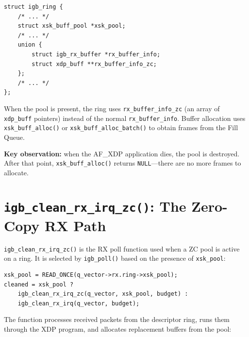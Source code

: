 \documentclass[11pt,a4paper,openany]{book}
\newcommand{\func}[1]{\texttt{#1()}}
\newcommand{\sym}[1]{\texttt{#1}}
\begin{document}
\begin{lstlisting}[caption={XSK pool reference in \texttt{igb\_ring} (igb.h)}]
struct igb_ring {
    /* ... */
    struct xsk_buff_pool *xsk_pool;
    /* ... */
    union {
        struct igb_rx_buffer *rx_buffer_info;
        struct xdp_buff **rx_buffer_info_zc;
    };
    /* ... */
};
\end{lstlisting}

When the pool is present, the ring uses \sym{rx\_buffer\_info\_zc} (an
array of \sym{xdp\_buff} pointers) instead of the normal
\sym{rx\_buffer\_info}.  Buffer allocation uses \func{xsk\_buff\_alloc}
or \func{xsk\_buff\_alloc\_batch} to obtain frames from the Fill Queue.

\textbf{Key observation:} when the AF\_XDP application dies, the pool
is destroyed.  After that point, \func{xsk\_buff\_alloc} returns
\texttt{NULL}---there are no more frames to allocate.

\section{\texttt{igb\_clean\_rx\_irq\_zc()}: The Zero-Copy RX Path}
\label{sec:clean-rx-zc}

\func{igb\_clean\_rx\_irq\_zc} is the RX poll function used when a ZC
pool is active on a ring.  It is selected by \func{igb\_poll} based on
the presence of \sym{xsk\_pool}:

\begin{lstlisting}[caption={ZC RX path selection in \texttt{igb\_poll()} (igb\_main.c:8300)}]
xsk_pool = READ_ONCE(q_vector->rx.ring->xsk_pool);
cleaned = xsk_pool ?
    igb_clean_rx_irq_zc(q_vector, xsk_pool, budget) :
    igb_clean_rx_irq(q_vector, budget);
\end{lstlisting}

The function processes received packets from the descriptor ring,
runs them through the XDP program, and allocates replacement buffers
from the pool:
\end{document}
